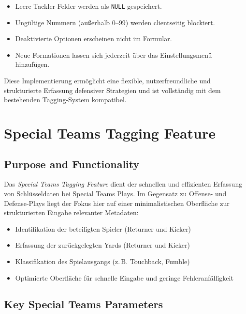 \documentclass[12pt]{article}
\begin{document}
\begin{itemize}
  \item Leere Tackler-Felder werden als \texttt{NULL} gespeichert.
  \item Ungültige Nummern (außerhalb 0–99) werden clientseitig blockiert.
  \item Deaktivierte Optionen erscheinen nicht im Formular.
  \item Neue Formationen lassen sich jederzeit über das Einstellungsmenü hinzufügen.
\end{itemize}

\bigskip

Diese Implementierung ermöglicht eine flexible, nutzerfreundliche und strukturierte Erfassung defensiver Strategien und ist vollständig mit dem bestehenden Tagging-System kompatibel.

\section{Special Teams Tagging Feature}

\subsection{Purpose and Functionality}

Das \textit{Special Teams Tagging Feature} dient der schnellen und effizienten Erfassung von Schlüsseldaten bei Special Teams Plays. Im Gegensatz zu Offense- und Defense-Plays liegt der Fokus hier auf einer minimalistischen Oberfläche zur strukturierten Eingabe relevanter Metadaten:

\begin{itemize}
  \item Identifikation der beteiligten Spieler (Returner und Kicker)
  \item Erfassung der zurückgelegten Yards (Returner und Kicker)
  \item Klassifikation des Spielausgangs (z.\,B. Touchback, Fumble)
  \item Optimierte Oberfläche für schnelle Eingabe und geringe Fehleranfälligkeit
\end{itemize}

\subsection{Key Special Teams Parameters}
\end{document}
